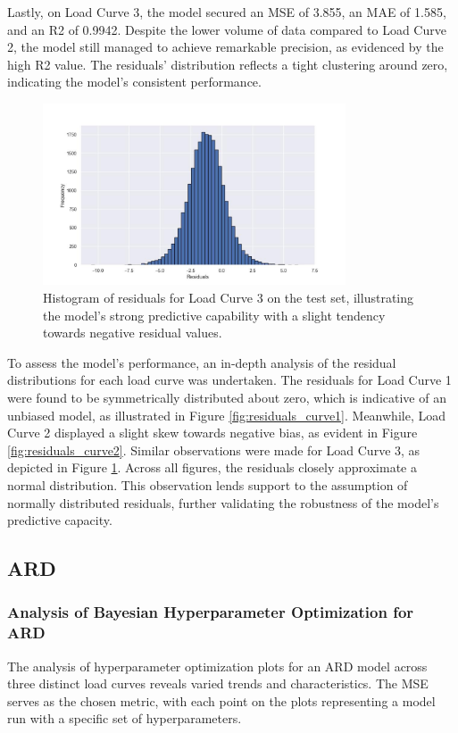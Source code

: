 \documentclass{article} %
\begin{document}
Lastly, on Load Curve 3, the model secured an \gls{MSE} of 3.855, an \gls{MAE} of 1.585, and an \gls{R2} of 0.9942. Despite the lower volume of data compared to Load Curve 2, the model still managed to achieve remarkable precision, as evidenced by the high \gls{R2} value. The residuals' distribution reflects a tight clustering around zero, indicating the model's consistent performance.


\begin{figure}[H]
\centering
\includegraphics[width=0.8\textwidth]{ressources/residuals/erg/lc3/residuals.jpg}
\caption{Histogram of residuals for Load Curve 3 on the test set, illustrating the model's strong predictive capability with a slight tendency towards negative residual values.}
\label{fig:residuals_curve3}
\end{figure}

To assess the model's performance, an in-depth analysis of the residual distributions for each load curve was undertaken. The residuals for Load Curve 1 were found to be symmetrically distributed about zero, which is indicative of an unbiased model, as illustrated in Figure \ref{fig:residuals_curve1}. 
Meanwhile, Load Curve 2 displayed a slight skew towards negative bias, as evident in Figure \ref{fig:residuals_curve2}. Similar observations were made for Load Curve 3, as depicted in Figure \ref{fig:residuals_curve3}. Across all figures, the residuals closely approximate a normal distribution. This observation lends support to the assumption of normally distributed residuals, further validating the robustness of the model's predictive capacity.



\subsection{ARD}
\subsubsection{Analysis of Bayesian Hyperparameter Optimization for ARD}
The analysis of hyperparameter optimization plots for an \gls{ARD} model across three distinct load curves reveals varied trends and characteristics. The \gls{MSE} serves as the chosen metric, with each point on the plots representing a model run with a specific set of hyperparameters. 
\end{document}
